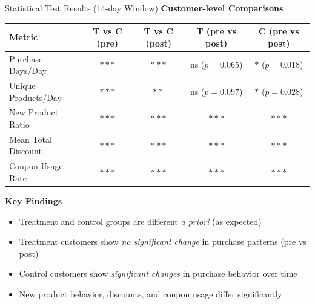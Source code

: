 \documentclass[aspectratio=169]{beamer}  %
\begin{document}
\begin{frame}{Statistical Test Results (14-day Window)}
\textbf{Customer-level Comparisons}
\begin{table}[h]
\centering
\scriptsize
\begin{tabular}{lcccc}
\toprule
\textbf{Metric} & \textbf{T vs C (pre)} & \textbf{T vs C (post)} & \textbf{T (pre vs post)} & \textbf{C (pre vs post)} \\
\midrule
Purchase Days/Day & $***$ & $***$ & ns ($p=0.065$) & $*$ ($p=0.018$) \\
Unique Products/Day & $***$ & $**$ & ns ($p=0.097$) & $*$ ($p=0.028$) \\
New Product Ratio & $***$ & $***$ & $***$ & $***$ \\
Mean Total Discount & $***$ & $***$ & $***$ & $***$ \\
Coupon Usage Rate & $***$ & $***$ & $***$ & $***$ \\
\bottomrule
\end{tabular}
\end{table}

\textbf{Key Findings}
\begin{itemize}
    \item Treatment and control groups are different \textit{a priori} (as expected)
    \item Treatment customers show \textit{no significant change} in purchase patterns (pre vs post)
    \item Control customers show \textit{significant changes} in purchase behavior over time
    \item New product behavior, discounts, and coupon usage differ significantly
\end{itemize}
\end{frame}
\end{document}
